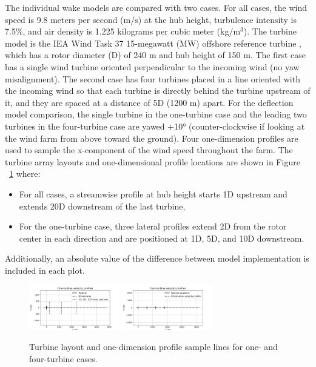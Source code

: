 \documentclass{iopconfser}
\newcommand{\ind}[]{\hspace{6mm}}
\begin{document}
\ind{}The individual wake models are compared with two cases.
For all cases, the wind speed is 9.8 meters per second (m/s) at the hub height, turbulence intensity is 7.5\%, and air density is 1.225 kilograms per cubic meter (kg/m$^3$).
The turbine model is the IEA Wind Task 37 15-megawatt (MW) offshore reference turbine \cite{gaertner2020iea}, which has a rotor diameter (D) of 240 m and hub height of 150 m.
The first case has a single wind turbine oriented perpendicular to the incoming wind (no yaw misalignment).
The second case has four turbines placed in a line oriented with the incoming wind so that each turbine is directly behind the turbine upstream of it, and they are spaced at a distance of 5D (1200 m) apart.
For the deflection model comparison, the single turbine in the one-turbine case and the leading two turbines in the four-turbine case are yawed +10° (counter-clockwise if looking at the wind farm from above toward the ground).
Four one-dimension profiles are used to sample the x-component of the wind speed throughout the farm.
The turbine array layouts and one-dimensional profile locations are shown in Figure ~\ref{fig:case_setup} where:
\begin{itemize}
\item For all cases, a streamwise profile at hub height starts 1D upstream and extends 20D downstream of the last turbine,
\item For the one-turbine case, three lateral profiles extend 2D from the rotor center in each direction and are positioned at 1D, 5D, and 10D downstream.
\end{itemize}
Additionally, an absolute value of the difference between model implementation is included in each plot.

\begin{figure}[h]
\centering
\includegraphics[width=0.35\textwidth]{figures/1t config.png}
\includegraphics[width=0.35\textwidth]{figures/4t config.png}
\\
\caption{Turbine layout and one-dimension profile sample lines for one- and four-turbine cases.}
\label{fig:case_setup}
\end{figure}
\end{document}
